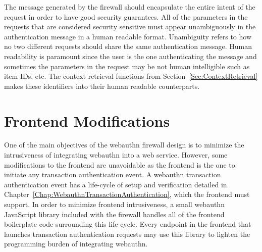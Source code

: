
The message generated by the firewall should encapsulate the entire intent of the request in order to have good security guarantees. All of the parameters in the requests that are considered security sensitive must appear unambiguously in the authentication message in a human readable format. Unambiguity refers to how no two different requests should share the same authentication message. Human readability is paramount since the user is the one authenticating the message and sometimes the parameters in the request may be not human intelligible such as item IDs, etc. The context retrieval functions from Section~\ref{Sec:ContextRetrieval} makes these identifiers into their human readable counterparts.

\section{Frontend Modifications}

One of the main objectives of the webauthn firewall design is to minimize the intrusiveness of integrating webauthn into a web service. However, some modifications to the frontend are unavoidable as the frontend is the one to initiate any transaction authentication event. A webauthn transaction authentication event has a life-cycle of setup and verification detailed in Chapter~\ref{Chap:WebauthnTransactionAuthentication}, which the frontend must support. In order to minimize frontend intrusiveness, a small webauthn JavaScript library included with the firewall handles all of the frontend boilerplate code surrounding this life-cycle. Every endpoint in the frontend that launches transaction authentication requests may use this library to lighten the programming burden of integrating webauthn. 




